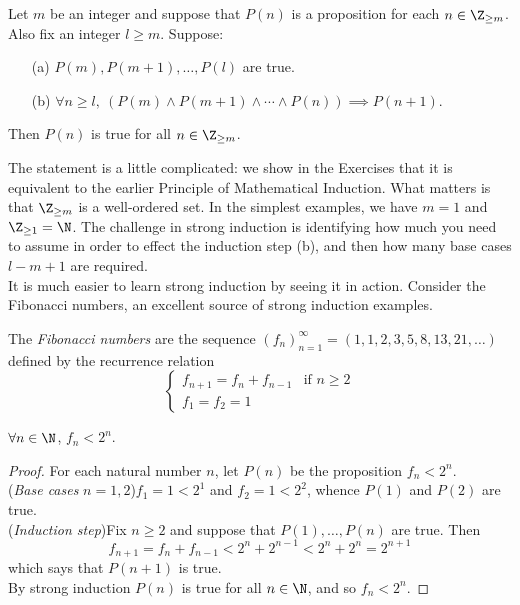 \begin{thm}\label{thm:indstrong}
Let $m$ be an integer and suppose that $P(n)$ is a proposition for each $n\in\Z_{\ge m}$. Also fix an integer $l\ge m$. Suppose:
\begin{enumerate}
  \item[(a)] $P(m),P(m+1),\ldots,P(l)$ are true.
  \item[(b)] $\forall n\ge l,\ (P(m)\wedge P(m+1)\wedge\cdots\wedge P(n))\implies P(n+1)$.
\end{enumerate}
Then $P(n)$ is true for all $n\in\Z_{\ge m}$.
\end{thm}

\noindent The statement is a little complicated: we show in the Exercises that it is equivalent to the earlier Principle of Mathematical Induction. What matters is that $\Z_{\ge m}$ is a well-ordered set. In the simplest examples, we have $m=1$ and $\Z_{\ge 1}=\N$. The challenge in strong induction is identifying how much you need to assume in order to effect the induction step (b), and then how many base cases $l-m+1$ are required.\\
It is much easier to learn strong induction by seeing it in action. Consider the Fibonacci numbers, an excellent source of strong induction examples.

\begin{defn}
The \emph{Fibonacci numbers} are the sequence $(f_n)_{n=1}^\infty=(1,1,2,3,5,8,13,21,\ldots)$ defined by the recurrence relation
\[\begin{cases}
f_{n+1}=f_n+f_{n-1}&\text{if }n\ge 2\\
f_1=f_2=1&
\end{cases}\]
\end{defn}


\begin{thm}\label{thm:fibon}
$\forall n\in\N$, $f_n<2^n$.
\end{thm}

\begin{proof}
For each natural number $n$, let $P(n)$ be the proposition $f_n<2^n$.\\[2pt]
(\emph{Base cases} $n=1,2$)\quad $f_1=1<2^1$ and $f_2=1<2^2$, whence $P(1)$ and $P(2)$ are true.\\[2pt]
(\emph{Induction step})\quad Fix $n\ge 2$ and suppose that $P(1),\ldots,P(n)$ are true. Then
\[f_{n+1}=f_n+f_{n-1}<2^n+2^{n-1}<2^n+2^n=2^{n+1}\]
which says that $P(n+1)$ is true.\\[2pt]
By strong induction $P(n)$ is true for all $n\in\N$, and so $f_n<2^n$.
\end{proof}


